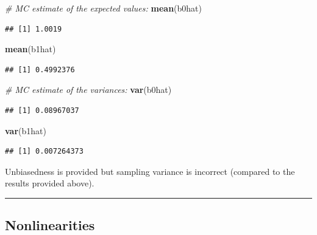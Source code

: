 \documentclass[]{book}
\newenvironment{Shaded}{\begin{snugshade}}{\end{snugshade}}
\newcommand{\CommentTok}[1]{\textcolor[rgb]{0.56,0.35,0.01}{\textit{#1}}}
\newcommand{\KeywordTok}[1]{\textcolor[rgb]{0.13,0.29,0.53}{\textbf{#1}}}
\newcommand{\NormalTok}[1]{#1}
\begin{document}
\begin{Shaded}
\begin{Highlighting}[]
\CommentTok{# MC estimate of the expected values:}
\KeywordTok{mean}\NormalTok{(b0hat)}
\end{Highlighting}
\end{Shaded}

\begin{verbatim}
## [1] 1.0019
\end{verbatim}

\begin{Shaded}
\begin{Highlighting}[]
\KeywordTok{mean}\NormalTok{(b1hat)}
\end{Highlighting}
\end{Shaded}

\begin{verbatim}
## [1] 0.4992376
\end{verbatim}

\begin{Shaded}
\begin{Highlighting}[]
\CommentTok{# MC estimate of the variances:}
\KeywordTok{var}\NormalTok{(b0hat)}
\end{Highlighting}
\end{Shaded}

\begin{verbatim}
## [1] 0.08967037
\end{verbatim}

\begin{Shaded}
\begin{Highlighting}[]
\KeywordTok{var}\NormalTok{(b1hat)}
\end{Highlighting}
\end{Shaded}

\begin{verbatim}
## [1] 0.007264373
\end{verbatim}

Unbiasedness is provided but sampling variance is incorrect (compared to the results provided above).

\begin{center}\rule{0.5\linewidth}{\linethickness}\end{center}

\hypertarget{nonlinearities}{%
\subsection{Nonlinearities}\label{nonlinearities}}
\end{document}
